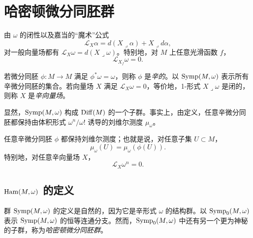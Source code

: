 \section{哈密顿微分同胚群}
\label{sec:hamiltonian-diffeomorphism-group}

由 $\omega$ 的闭性以及嘉当的“魔术”公式
\[
  \mathcal L_X\alpha=d(X\mathbin{\lrcorner}\alpha)
  +X\mathbin{\lrcorner}d\alpha,
\]
对一般向量场都有
$\mathcal L_X\omega=d(X\mathbin{\lrcorner}\omega)$。特别地，对 $M$ 上任意光滑函数 $f$，
\begin{equation}
  \mathcal L_{X_f}\omega=0.
  \label{eq:2.3.19}
\end{equation}

\begin{definition}
\label{def:symplectic-diffeomorphism-vector-field}
若微分同胚 $\phi:M\to M$ 满足 $\phi^*\omega=\omega$，则称 $\phi$ 是\emph{辛的}。以 $\operatorname{Symp}(M,\omega)$ 表示所有辛微分同胚的集合。若向量场 $X$ 满足 $\mathcal L_X\omega=0$，等价地，1-形式 $X\mathbin{\lrcorner}\omega$ 是闭的，则称 $X$ 是\emph{辛向量场}。
\end{definition}

显然，$\operatorname{Symp}(M,\omega)$ 构成 $\operatorname{Diff}(M)$ 的一个子群。事实上，由定义，任意辛微分同胚都保持由体积形式 $\omega^n/\omega!$ 诱导的刘维尔测度 $\mu_\omega$。

\begin{lemma}[刘维尔引理]
\label{lem:liouville-measure-preserved}
任意辛微分同胚 $\phi$ 都保持刘维尔测度；也就是说，对任意子集 $U\subset M$，
\[
  \mu_\omega(U)=\mu_\omega(\phi(U)).
\]
特别地，对任意辛向量场 $X$，
\[
  \mathcal L_X\omega^n=0.
\]
\end{lemma}

\subsection{\texorpdfstring{$\operatorname{Ham}(M,\omega)$ 的定义}{Ham(M, omega) 的定义}}

群 $\operatorname{Symp}(M,\omega)$ 的定义是自然的，因为它是辛形式 $\omega$ 的结构群。以 $\operatorname{Symp}_0(M,\omega)$ 表示 $\operatorname{Symp}(M,\omega)$ 的恒等连通分支。然而，$\operatorname{Symp}_0(M,\omega)$ 中还有另一个更为神秘的子群，称为\emph{哈密顿微分同胚群}。


